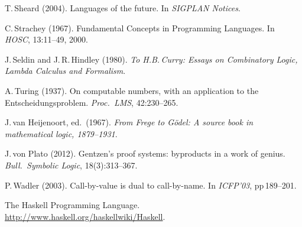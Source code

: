 \documentclass[11pt,twocolumn]{article}
\begin{document}
{\begin{thebibliography}{000}
T.\,Sheard (2004).
\newblock Languages of the future.
\newblock In \emph{SIGPLAN Notices}.

C.\,Strachey (1967).
\newblock Fundamental Concepts in Programming Languages.  
\newblock In \emph{HOSC}, 13:11--49, 2000.


J.\,Seldin and J.\,R.\,Hindley (1980).
\newblock \emph{To H.B.\,Curry: Essays on Combinatory Logic, Lambda
  Calculus and Formalism}.
 
A.\,Turing (1937). 
\newblock On computable numbers, with an application to the
  Entscheidungsproblem. 
\newblock \emph{Proc.\ LMS}, 42:230--265.

J.\,van Heijenoort, ed.\ (1967).
\newblock \emph{From Frege to G\"odel: A source book in mathematical
  logic, 1879--1931}.

J.\,von Plato (2012).
\newblock Gentzen's proof systems: byproducts in a work of genius.
\newblock \emph{Bull.\ Symbolic Logic}, 18(3):313--367.


P.\,Wadler (2003).
\newblock Call-by-value is dual to call-by-name.
\newblock In \emph{ICFP'03}, pp\,189--201.

The Haskell Programming Language.
\newblock \url{http://www.haskell.org/haskellwiki/Haskell}.
\end{thebibliography}
}
\end{document}
